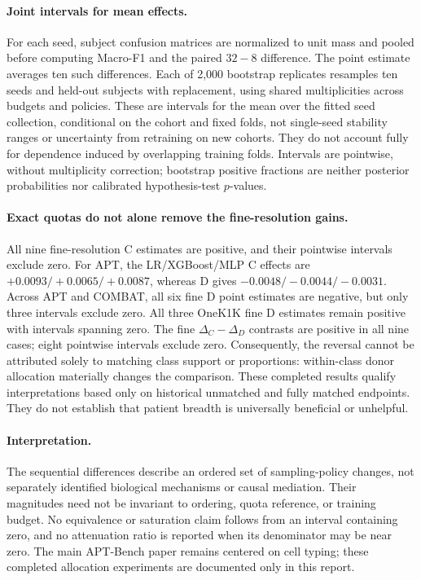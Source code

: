 \paragraph{Joint intervals for mean effects.}
For each seed, subject confusion matrices are normalized to unit mass and
pooled before computing Macro-F1 and the paired $32-8$ difference. The point
estimate averages ten such differences. Each of 2,000 bootstrap replicates
resamples ten seeds and held-out subjects with replacement, using shared
multiplicities across budgets and policies. These are intervals for the
mean over the fitted seed collection, conditional on the cohort and fixed
folds, not single-seed stability ranges or uncertainty from retraining on
new cohorts. They do not account fully for dependence induced by overlapping
training folds. Intervals are pointwise, without multiplicity correction;
bootstrap positive fractions are neither posterior probabilities nor
calibrated hypothesis-test $p$-values.

\paragraph{Exact quotas do not alone remove the fine-resolution gains.}
All nine fine-resolution C estimates are positive, and their pointwise
intervals exclude zero. For APT, the LR/XGBoost/MLP C effects are
$+0.0093/+0.0065/+0.0087$, whereas D gives
$-0.0048/-0.0044/-0.0031$. Across APT and COMBAT, all six fine D point
estimates are negative, but only three intervals exclude zero. All three
OneK1K fine D estimates remain positive with intervals spanning zero.
The fine $\Delta_C-\Delta_D$ contrasts are positive in all nine cases;
eight pointwise intervals exclude zero. Consequently, the reversal cannot
be attributed solely to matching class support or proportions: within-class
donor allocation materially changes the comparison. These completed results
qualify interpretations based only on historical unmatched and fully matched
endpoints. They do not establish that patient breadth is universally
beneficial or unhelpful.

\paragraph{Interpretation.}
The sequential differences describe an ordered set of sampling-policy
changes, not separately identified biological mechanisms or causal mediation.
Their magnitudes need not be invariant to ordering, quota reference, or
training budget. No equivalence or saturation claim follows from an interval
containing zero, and no attenuation ratio is reported when its denominator
may be near zero. The main APT-Bench paper remains centered on cell typing;
these completed allocation experiments are documented only in this report.


